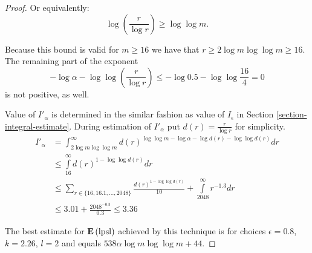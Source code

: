 \begin{proof}
Or equivalently:
\[
	\log \left( \frac{r}{\log r} \right) \geq \log \log m \text{.}
\]

Because this bound is valid for $m \geq 16$ we have that $r \geq 2 \log m \log \log m \geq 16$. The remaining part of the exponent \[ -\log \alpha - \log \log \left( \frac{r}{\log r} \right) \leq -\log 0.5 - \log \log \frac{16}{4} = 0 \] is not positive, as well. 

Value of $I'_\alpha$ is determined in the similar fashion as value of $I_\epsilon$ in Section \ref{section-integral-estimate}. During estimation of $I'_\alpha$ put $d(r) = \frac{r}{\log r}$ for simplicity.
\[
\begin{split}
I'_\alpha 
	& = \int_{2 \log m \log \log m}^{\infty} d(r) ^ {\log \log m - \log \alpha - \log d(r) - \log \log d(r)} dr \\
	& \leq \int\limits_{16}^{\infty} d(r) ^ {1 - \log \log d(r)} dr \\
	& \leq \displaystyle\sum_{r \in \{16, 16.1, \dots, 2048 \}} \frac{d(r) ^ {1 - \log \log d(r)}}{10} + 
		\int\limits_{2048}^{\infty} r ^ {-1.3} dr \\
	& \leq 3.01 + \frac{2048 ^ {-0.3}}{0.3} \leq 3.36
\end{split}
\]

The best estimate for $\mathbf{E}\left(\mathrm{lpsl}\right)$ achieved by this technique is for choices $\epsilon = 0.8$, $k = 2.26$, $l = 2$ and equals $538 \alpha \log m \log \log m + 44$.
\end{proof}
